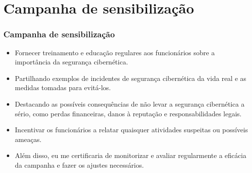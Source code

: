 \section{Campanha de sensibilização}
\begin{frame}
  \frametitle{Campanha de sensibilização}
  \begin{itemize}
    \item Fornecer treinamento e educação regulares aos funcionários sobre a importância da segurança cibernética.
    \item Partilhando exemplos de incidentes de segurança cibernética da vida real e as medidas tomadas para evitá-los.
    \item Destacando as possíveis consequências de não levar a segurança cibernética a sério, como perdas financeiras, danos à reputação e responsabilidades legais.
    \item Incentivar os funcionários a relatar quaisquer atividades suspeitas ou possíveis ameaças.
    \item Além disso, eu me certificaria de monitorizar e avaliar regularmente a eficácia da campanha e fazer os ajustes necessários.
  \end{itemize}
\end{frame}

